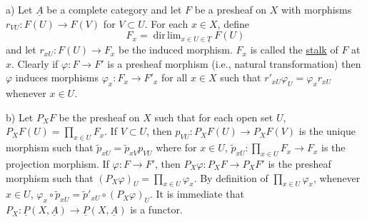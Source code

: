 
a) Let $\underline{A}$ be a complete category and let $F$ be a presheaf on $X$ with morphisms $r_{VU}:F(U)\longrightarrow F(V)$ for $V\subset U$. For each $x\in X$, define
\[
F_x=\mathop{\mathrm{dir}\,\lim}_{x\in U\in\underline{T}}F(U)
\]
and let $r_{xU}:F(U)\longrightarrow F_x$ be the induced morphism. $F_x$ is called the \uline{stalk} of $F$ at $x$. Clearly if $\varphi:F\longrightarrow F'$ is a presheaf morphism (i.e., natural transformation) then $\varphi$ induces morphisms $\varphi_x:F_x\longrightarrow F'_x$ for all $x\in X$ such that $r'_{xU}\varphi_U=\varphi_xr_{xU}$ whenever $x\in U$.

b) Let $P_XF$ be the presheaf on $X$ such that for each open set $U$, $P_XF(U)=\prod_{x\in U}F_x$. If $V\subset U$, then $p_{VU}:P_XF(U)\longrightarrow P_XF(V)$ is the unique morphism such that $\widetilde{p}_{xU}=\widetilde{p}_{xV}p_{VU}$ where for $x\in U$, $\widetilde{p}_{xU}:\prod_{x\in U}F_x\longrightarrow F_x$ is the projection morphism. If $\varphi:F\longrightarrow F'$, then $P_X\varphi:P_XF\longrightarrow P_XF'$ is the presheaf morphism such that $(P_X\varphi)_U=\prod_{x\in U}\varphi_x$. By definition of $\prod_{x\in U}\varphi_x$, whenever $x\in U$, $\varphi_x\circ\widetilde{p}_{xU}=\widetilde{p}'_{xU}\circ(P_X\varphi)_U$. It is immediate that $P_X:\underline{P}(X,\underline{A})\longrightarrow\underline{P}(X,\underline{A})$ is a functor.
